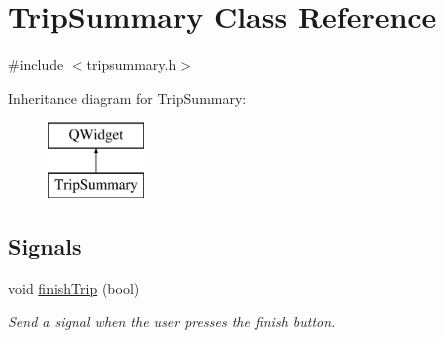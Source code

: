 \hypertarget{class_trip_summary}{}\section{Trip\+Summary Class Reference}
\label{class_trip_summary}


{\ttfamily \#include $<$tripsummary.\+h$>$}

Inheritance diagram for Trip\+Summary\+:\begin{figure}[H]
\begin{center}
\leavevmode
\includegraphics[height=2.000000cm]{class_trip_summary}
\end{center}
\end{figure}
\subsection*{Signals}
\begin{DoxyCompactItemize}
\item 
void \hyperlink{class_trip_summary_a42d4d98e730c27b257b61e878169a687}{finish\+Trip} (bool)
\begin{DoxyCompactList}\small\item\em Send a signal when the user presses the finish button. \end{DoxyCompactList}\end{DoxyCompactItemize}

